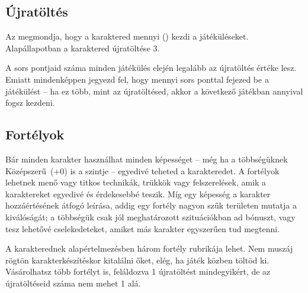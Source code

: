 \subsection{Újratöltés}

Az  megmondja, hogy a karaktered mennyi  () kezdi a játéküléseket. Alapállapotban a karaktered újratöltése 3.

A sors pontjaid száma minden játékülés elején legalább az újratöltés értéke lesz. Emiatt mindenképpen jegyezd fel, hogy mennyi sors ponttal fejezed be a játékülést -- ha ez több, mint az újratöltésed, akkor a következő játékban annyival fogsz kezdeni.


\subsection{Fortélyok}

Bár minden karakter használhat minden képességet -- még ha a többségüknek Középszerű~(+0) is a szintje --  egyedivé teheted a karakteredet. A fortélyok lehetnek menő vagy titkos technikák, trükkök vagy felszerelések, amik a karaktereket egyedivé és érdekesebbé teszik. Míg egy képesség a karakter hozzáértésének átfogó leírása, addig egy fortély nagyon szűk területen mutatja a kiválóságát; a többségük csak jól meghatározott szituációkban ad bónuszt, vagy tesz lehetővé cselekedeteket, amiket más karakter egyszerűen tud megtenni.

A karakterednek alapértelmezésben három fortély rubrikája lehet. Nem muszáj rögtön karakterkészítéskor kitalálni őket, elég, ha játék közben töltöd ki. Vásárolhatsz több fortélyt is, feláldozva 1 újratöltést mindegyikért, de az újratöltéseid száma nem mehet 1 alá.
